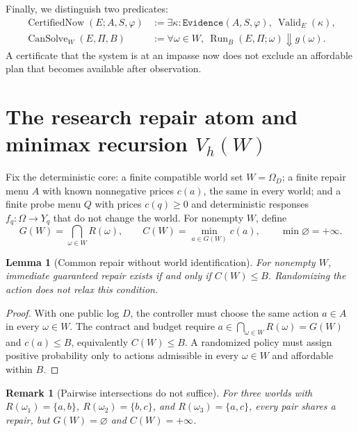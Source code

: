 \documentclass[11pt,a4paper]{article}
\theoremstyle{preprintthm}
\newtheorem{lemma}[theorem]{Lemma}
\theoremstyle{preprintdef}
\newtheorem{remark}[theorem]{Remark}
\newcommand{\Valid}{\operatorname{Valid}}
\begin{document}
Finally, we distinguish two predicates:
\begin{equation}
  \begin{aligned}
    \operatorname{CertifiedNow}(E;A,S,\varphi) &:= \exists\kappa:\texttt{Evidence}(A,S,\varphi),\ \Valid_E(\kappa),\\
    \operatorname{CanSolve}_W(E,\Pi,B) &:= \forall\omega\in W,\ \operatorname{Run}_B(E,\Pi;\omega)\Downarrow g(\omega).
  \end{aligned}
\end{equation}
A certificate that the system is at an impasse now does not exclude an affordable plan that becomes available after observation.

\section{The research repair atom and minimax recursion \texorpdfstring{$V_h(W)$}{V\_h(W)}}

Fix the deterministic core: a finite compatible world set $W=\Omega_D$; a finite repair menu $A$ with known nonnegative prices $c(a)$, the same in every world; and a finite probe menu $Q$ with prices $c(q)\ge0$ and deterministic responses $f_q:\Omega\to Y_q$ that do not change the world. For nonempty $W$, define
\begin{equation}
  G(W) = \bigcap_{\omega\in W} R(\omega),
  \qquad
  C(W) = \min_{a\in G(W)} c(a),
  \qquad
  \min\varnothing = +\infty.
\end{equation}

\begin{lemma}[Common repair without world identification]
\label{lem:common_repair}
For nonempty $W$, immediate guaranteed repair exists if and only if $C(W)\le B$. Randomizing the action does not relax this condition.
\end{lemma}
\begin{proof}
With one public log $D$, the controller must choose the same action $a\in A$ in every $\omega\in W$. The contract and budget require $a\in\bigcap_{\omega\in W}R(\omega)=G(W)$ and $c(a)\le B$, equivalently $C(W)\le B$. A randomized policy must assign positive probability only to actions admissible in every $\omega\in W$ and affordable within $B$.
\end{proof}

\begin{remark}[Pairwise intersections do not suffice]
For three worlds with $R(\omega_1)=\{a,b\}$, $R(\omega_2)=\{b,c\}$, and $R(\omega_3)=\{a,c\}$, every pair shares a repair, but $G(W)=\varnothing$ and $C(W)=+\infty$.
\end{remark}
\end{document}
